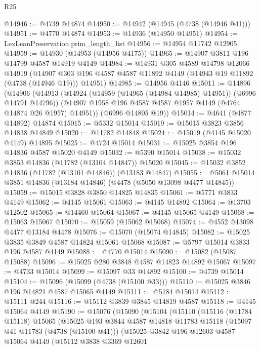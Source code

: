 \begin{lexlean}{R25}
\begin{coremodule}
@14946 := @4739 @14874
@14950 := @14942 (@14945 (@4738 (@14946 @41)))
@14951 := @4770 @14874
@14953 := @14936 (@14950 @14951)
@14954 := LexLeanPreservation.prim_length_list
@14956 := @14954 @11742 @12905
@14959 := @14930 (@14953 (@14956 @4175))
@14965 := @14907 @3811 @196 @14799 @4587 @14919 @4149
@14984 := @14931
    @305
    @4589
    @14798
    @12066
    @14919
    (@14907 @303 @196 @4587 @4587 @11892 @4149 (@14943 @19 @11892 (@4738 (@14946 @19))) @14951)
@14985 := @14956 @4146
@15011 := @14896
    (@14906
      (@14913
        (@14924 (@14959 (@14965 (@14984 @14985) @14951)) (@6996 @14791 @14796))
        (@14907 @1958 @196 @4587 @4587 @1957 @4149 (@4764 @14874 @26 @1957) @14951))
      (@6996 @14805 @19))
@15014 := @4641 (@4877 @14892) @14874
@15015 := @5332 @15014
@15019 := @15015 @3823 @3856 @14838 @14849
@15020 := @11782 @14848
@15024 := @15019 (@4145 @15020 @4149) @14895
@15025 := @4724 @15014
@15031 := @15025 @3854 @196 @14836 @4587 @15020 @4149
@15032 := @5390 @15014
@15038 := @15032 @3853 @14836 (@11782 (@13104 @14847)) @15020
@15045 := @15032 @3852 @14836 (@11782 (@13101 @14846)) (@13183 @14847)
@15055 := @5061 @15014 @3851 @14836 (@13184 @14846) (@4478 (@5050 @13098 @4477 @14845))
@15059 := @15015 @3828 @3850 @14825 @14835
@15061 := @5771 @3833 @4149
@15062 := @4145 @15061
@15063 := @4145 @14892
@15064 := @13703 @12502
@15065 := @14460 @15064
@15067 := @4145 @15065 @4149
@15068 := @15063 @15067
@15070 := @15059 (@15062 @15068)
@15074 := @4552 @13098 @4477 @13184 @4478
@15076 := @15070 (@15074 @14845)
@15082 := @15025 @3835 @3849 @4587 @14824 @15061 @15068
@15087 := @5797 @15014 @3833 @196 @4587 @4149
@15088 := @4770 @15014
@15090 := @15082 (@15087 @15088)
@15096 := @15025 @280 @3848 @4587 @14823 @14892 @15067
@15097 := @4733 @15014
@15099 := @15097 @33 @14892
@15100 := @4739 @15014
@15104 := @15096 (@15099 (@4738 (@15100 @33)))
@15110 := @15025 @3846 @196 @14821 @4587 @15065 @4149
@15111 := @5184 @15014
@15112 := @15111 @244
@15116 := @15112 @3839 @3845 @14819 @4587
@15118 := @4145 @15064 @4149
@15190 := @15076
    (@15090
      (@15104
        (@15110
          (@15116
            (@11784 @15118)
            @15065
            (@15025
              @193
              @3844
              @4587
              @14818
              @11783
              @15118
              (@15097 @41 @11783 (@4738 (@15100 @41)))
              (@15025
                @3842
                @196
                @12603
                @4587
                @15064
                @4149
                (@15112
                  @3838
                  @3369
                  @12601

\end{coremodule}
\end{lexlean}
